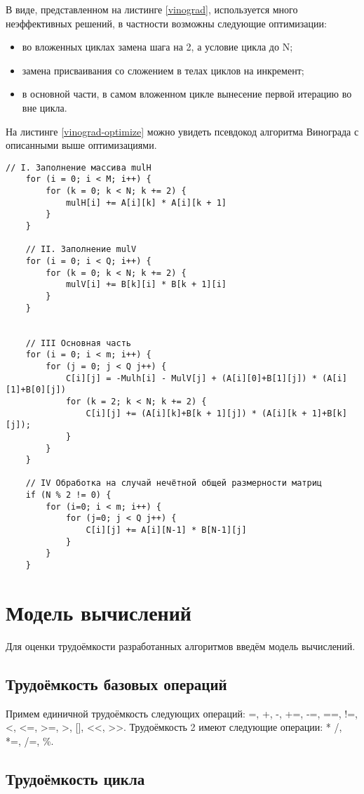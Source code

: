В виде, представленном на листинге \ref{vinograd}, используется много неэффективных решений, в частности возможны следующие оптимизации:
\begin{itemize}
	\item во вложенных циклах замена шага на 2, а условие цикла до N;
	\item замена присваивания со сложением в телах циклов на инкремент; 
	\item в основной части, в самом вложенном цикле вынесение первой итерацию во вне цикла.
\end{itemize}

На листинге \ref{vinograd-optimize} можно увидеть псевдокод алгоритма Винограда с описанными выше оптимизациями.

\begin{lstlisting}[label=vinograd-optimize, caption={Псевдокод алгоритма Винограда с оптимизациями}]
	// I. Заполнение массива mulH
	for (i = 0; i < M; i++) {
		for (k = 0; k < N; k += 2) {
			mulH[i] += A[i][k] * A[i][k + 1]   
		}
	}
	
	// II. Заполнение mulV
	for (i = 0; i < Q; i++) {
		for (k = 0; k < N; k += 2) {
			mulV[i] += B[k][i] * B[k + 1][i]  
		}
	}
	
	
	// III Основная часть
	for (i = 0; i < m; i++) {
		for (j = 0; j < Q j++) {
			C[i][j] = -Mulh[i] - MulV[j] + (A[i][0]+B[1][j]) * (A[i][1]+B[0][j])
			for (k = 2; k < N; k += 2) {
				C[i][j] += (A[i][k]+B[k + 1][j]) * (A[i][k + 1]+B[k][j]);  
			}
		}
	}
	
	// IV Обработка на случай нечётной общей размерности матриц
	if (N % 2 != 0) {
		for (i=0; i < m; i++) {
			for (j=0; j < Q j++) {
				C[i][j] += A[i][N-1] * B[N-1][j]
			}
		}
	}
\end{lstlisting}

\section{Модель вычислений}
Для оценки трудоёмкости разработанных алгоритмов введём модель вычислений.

\subsection{Трудоёмкость базовых операций}
Примем единичной трудоёмкость следующих операций: =, +, -, +=, -=, ==, !=, <, <=, >=, >, [], <<, >>.
Трудоёмкость 2 имеют следующие операции: * /, *=, /=, \%.


\subsection{Трудоёмкость цикла}

